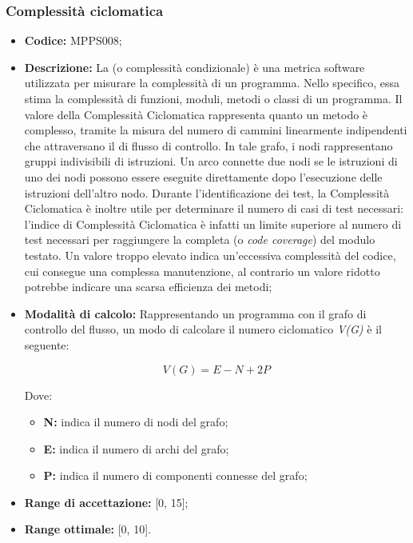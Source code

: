 \documentclass[../NormediProgetto.tex]{subfiles}
\begin{document}
\subsubsection{Complessità ciclomatica}

\begin{itemize}
	\item \textbf{Codice:} MPPS008;
	
	\item \textbf{Descrizione:} La  (o complessità condizionale) è una metrica software utilizzata per misurare la complessità di un programma. Nello specifico, essa stima la complessità di funzioni, moduli, metodi o classi di un programma. Il valore della Complessità Ciclomatica rappresenta quanto un metodo è complesso, tramite la misura del numero di cammini linearmente indipendenti che attraversano il  di flusso di controllo. In tale grafo, i nodi rappresentano gruppi indivisibili di istruzioni. Un arco connette due nodi se le istruzioni di uno dei nodi possono essere eseguite direttamente dopo l'esecuzione delle istruzioni dell'altro nodo. Durante l’identificazione dei test, la Complessità Ciclomatica è inoltre utile per determinare il numero di casi di test necessari: l’indice di Complessità Ciclomatica è infatti un limite superiore al numero di test necessari per raggiungere la completa  (o \textit{code coverage}) del modulo testato. Un valore troppo elevato indica un'eccessiva complessità del codice, cui consegue una complessa manutenzione, al contrario un valore ridotto potrebbe indicare una scarsa efficienza dei metodi;
	
	\item \textbf{Modalità di calcolo:} Rappresentando un programma con il grafo di controllo del flusso, un modo di calcolare il numero ciclomatico \textit{V(G)} è il seguente:
	
	\[ V(G) = E - N + 2P \]
	
	Dove:
	
	\begin{itemize}
		\item \textbf{N:} indica il numero di nodi del grafo;
		\item \textbf{E:} indica il numero di archi del grafo;
		\item \textbf{P:} indica il numero di componenti connesse del grafo;
	\end{itemize}
	
	\item \textbf{Range di accettazione:} [0, 15];
	\item \textbf{Range ottimale:} [0, 10].
\end{itemize}
\end{document}
